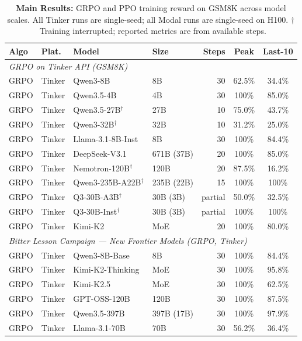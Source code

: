 \documentclass{article}
\begin{document}
\begin{table}[t]
\centering
\caption{\textbf{Main Results:} GRPO and PPO training reward on GSM8K across model scales.
All Tinker runs are single-seed; all Modal runs are single-seed on H100.
$\dagger$~Training interrupted; reported metrics are from available steps.}
\label{tab:main_results}
\scriptsize
\setlength{\tabcolsep}{3pt}
\begin{tabular}{@{}l l l l r c c@{}}
\toprule
\textbf{Algo} & \textbf{Plat.} & \textbf{Model} & \textbf{Size} & \textbf{Steps} & \textbf{Peak} & \textbf{Last-10} \\
\midrule
\multicolumn{7}{l}{\textit{GRPO on Tinker API (GSM8K)}} \\
\midrule
GRPO & Tinker & Qwen3-8B & 8B & 30 & 62.5\% & 34.4\% \\
GRPO & Tinker & Qwen3.5-4B & 4B & 30 & 100\% & 85.0\% \\
GRPO & Tinker & Qwen3.5-27B$^\dagger$ & 27B & 10 & 75.0\% & 43.7\% \\
GRPO & Tinker & Qwen3-32B$^\dagger$ & 32B & 10 & 31.2\% & 25.0\% \\
GRPO & Tinker & Llama-3.1-8B-Inst & 8B & 30 & 100\% & 84.4\% \\
GRPO & Tinker & DeepSeek-V3.1 & 671B (37B) & 20 & 100\% & 85.0\% \\
GRPO & Tinker & Nemotron-120B$^\dagger$ & 120B & 20 & 87.5\% & 16.2\% \\
GRPO & Tinker & Qwen3-235B-A22B$^\dagger$ & 235B (22B) & 15 & 100\% & 100\% \\
GRPO & Tinker & Q3-30B-A3B$^\dagger$ & 30B (3B) & partial & 50.0\% & 32.5\% \\
GRPO & Tinker & Q3-30B-Inst$^\dagger$ & 30B (3B) & partial & 100\% & 100\% \\
GRPO & Tinker & Kimi-K2 & MoE & 20 & 100\% & 80.0\% \\
\midrule
\multicolumn{7}{l}{\textit{Bitter Lesson Campaign --- New Frontier Models (GRPO, Tinker)}} \\
\midrule
GRPO & Tinker & Qwen3-8B-Base & 8B & 30 & 100\% & 84.4\% \\
GRPO & Tinker & Kimi-K2-Thinking & MoE & 30 & 100\% & 95.8\% \\
GRPO & Tinker & Kimi-K2.5 & MoE & 30 & 100\% & 62.5\% \\
GRPO & Tinker & GPT-OSS-120B & 120B & 30 & 100\% & 87.5\% \\
GRPO & Tinker & Qwen3.5-397B & 397B (17B) & 30 & 100\% & 97.9\% \\
GRPO & Tinker & Llama-3.1-70B & 70B & 30 & 56.2\% & 36.4\% \\

\end{tabular}
\end{table}
\end{document}
